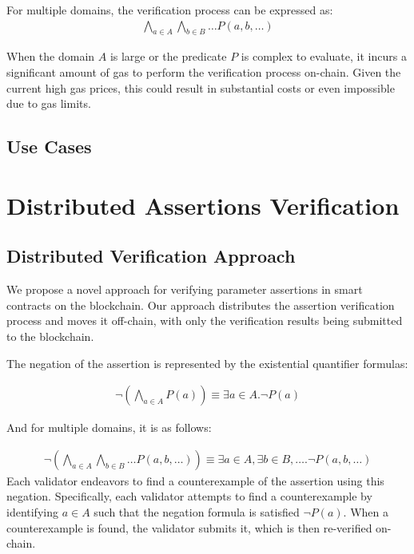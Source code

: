 \documentclass[runningheads]{llncs}
\begin{document}
For multiple domains, the verification process can be expressed as:
\begin{gather}
  \label{eq:4}
  \bigwedge_{a \in A} \bigwedge_{b \in B} \dots P(a, b, \dots)
\end{gather}

When the domain $A$ is large or the predicate $P$ is complex to evaluate, it incurs a significant amount of gas to perform the verification process on-chain.  Given the current high gas prices, this could result in substantial costs or even impossible due to gas limits. 
\subsection{Use Cases}

\section{Distributed Assertions Verification}
\label{sec:distributed-assertion-verification}
\subsection{Distributed Verification Approach}
We propose a novel approach for verifying parameter assertions in smart contracts on the blockchain. Our approach distributes the assertion verification process and moves it off-chain, with only the verification results being submitted to the blockchain.

The negation of the assertion is represented by the existential quantifier formulas:

\begin{gather}
\label{eq:3}
\neg \left( \bigwedge_{a \in A} P(a) \right) \equiv \exists a \in A. \neg P(a)
\end{gather}

And for multiple domains, it is as follows:

\begin{gather}
\label{eq:4}
\neg \left( \bigwedge_{a \in A} \bigwedge_{b \in B} \dots P(a, b, \dots) \right) \equiv \exists a \in A, \exists b \in B, \dots . \neg P(a, b, \dots)
\end{gather}
Each validator endeavors to find a counterexample of the assertion using this negation. Specifically, each validator attempts to find a counterexample by identifying $a \in A$ such that the negation formula is satisfied $\neg P(a)$. When a counterexample is found, the validator submits it, which is then re-verified on-chain. 
\end{document}
